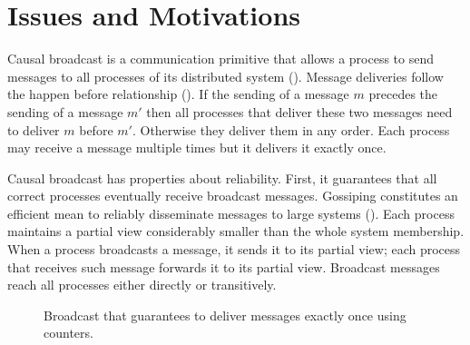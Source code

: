 
\section{Issues and Motivations}
\label{sec:motivations}

Causal broadcast is a communication primitive that allows a process to send
messages to all processes of its distributed system (\REF). Message deliveries
follow the happen before relationship (\REF). If the sending of a message $m$
precedes the sending of a message $m'$ then all processes that deliver these two
messages need to deliver $m$ before $m'$. Otherwise they deliver them in any
order. Each process may receive a message multiple times but it delivers it
exactly once.

Causal broadcast has properties about reliability. First, it guarantees that all
correct processes eventually receive broadcast messages. Gossiping constitutes
an efficient mean to reliably disseminate messages to large systems (\REF). Each
process maintains a partial view considerably smaller than the whole system
membership. When a process broadcasts a message, it sends it to its partial
view; each process that receives such message forwards it to its partial
view. Broadcast messages reach all processes either directly or transitively.

\begin{figure*}
  \begin{center}
    \hspace{10pt}
    \hspace{10pt}
    \hspace{10pt}
    \hspace{10pt}
    \caption{\label{fig:generalpurge}Broadcast that guarantees to deliver 
      messages exactly once using counters.}
  \end{center}
\end{figure*}



